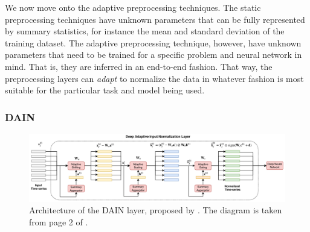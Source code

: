 \documentclass{statsmsc}
\begin{document}
{%
We now move onto the adaptive preprocessing techniques. The static preprocessing techniques have unknown parameters that can be
fully represented by summary statistics, for instance the mean and standard deviation of the training dataset. The adaptive
preprocessing technique, however, have unknown parameters that need to be trained for a specific problem and neural network in mind.
That is, they are inferred in an end-to-end fashion. That way, the preprocessing layers can \textit{adapt} to normalize the data
in whatever fashion is most suitable for the particular task and model being used.

\subsubsection{DAIN}%
\label{ssub:DAIN}



\begin{figure}
    \begin{center}
        \includegraphics[width=\textwidth]{diagrams/dain_diagram.pdf}
    \end{center}
    \caption{Architecture of the \acf{DAIN} layer, proposed by \citeauthor{dain}. The diagram
    is taken from page 2 of \citep{dain}.}
    \label{fig:dain-arch}
\end{figure}

}
\end{document}
